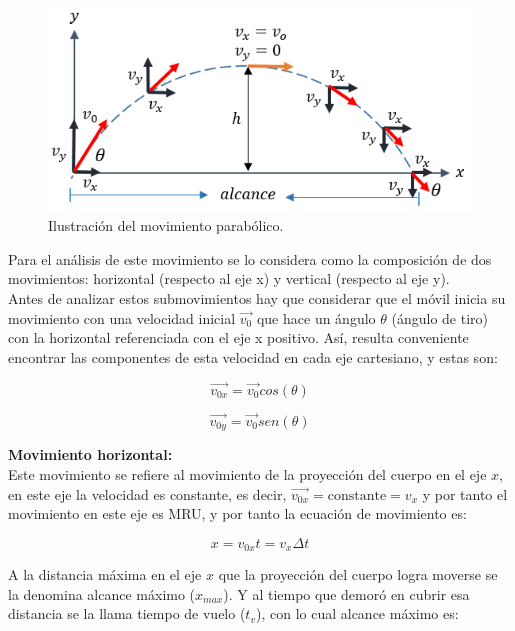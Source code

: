 \documentclass[a5paper,pagesize,10pt,bibtotoc,pointlessnumbers,
normalheadings,DIV=9,fleqn,x11names,table,twoside=false]{scrbook}
\begin{document}
\begin{figure}[ht]
 \centering
 \includegraphics[scale=0.6]{images/movimiento_parabolico.png}
 \caption{Ilustración del movimiento parabólico.}\label{movparabola}
\end{figure}   

Para el análisis de este movimiento se lo considera como la composición de dos movimientos: horizontal (respecto al eje x) y 
vertical (respecto al eje y).\\

Antes de analizar estos submovimientos hay que considerar que el móvil inicia su movimiento con una velocidad inicial $\vec{v_0}$ 
que hace un ángulo $\theta$ (ángulo de tiro) con la horizontal referenciada con el eje x positivo. Así, resulta conveniente 
encontrar las componentes de esta velocidad en cada eje cartesiano, y estas son:

\begin{equation}
 \vec{v_{0x}}=\vec{v_0}cos(\theta)
\end{equation}

\begin{equation}
 \vec{v_{0y}}=\vec{v_0}sen(\theta)
\end{equation}

\textbf{Movimiento horizontal:}\\

Este movimiento se refiere al movimiento de la proyección del cuerpo en el eje $x$, en este eje la velocidad es constante, es 
decir, $\vec{v_{0x}} =  \text{constante} = v_x$ y por tanto el movimiento en este eje es MRU, y por tanto la ecuación de 
movimiento es:

\begin{equation}
 x = v_{0x}t=v_x \Delta t
\end{equation}

A la distancia máxima en el eje $x$ que la proyección del cuerpo logra moverse se la denomina alcance máximo ($x_{max}$). Y al 
tiempo que demoró en cubrir esa distancia se la llama tiempo de vuelo ($t_v$), con lo cual alcance máximo es:
\end{document}
